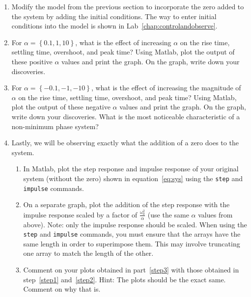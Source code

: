 \begin{enumerate}
    \item Modify the model from the previous section to incorporate the zero
          added to the system by adding the initial conditions. The way to enter
          initial conditions into the model is shown in
          Lab~\ref{chap:controlandobserve}.

    \item For \(\alpha = \left\{0.1, 1, 10\right\} \), what is the effect of increasing %
          \(\alpha \) on the rise time, settling time, overshoot, and peak
          time?  Using \textsf{Matlab}, plot the output of these positive
          \(\alpha \) values and print the graph.  On the graph, write down your
          discoveries.\label{step1}

    \item For \(\alpha = \left\{-0.1, -1, -10\right\} \), what is the effect of increasing the %
          magnitude of \(\alpha \) on the rise time, settling time, overshoot,
          and peak time? Using \textsf{Matlab}, plot the output of these negative \(\alpha \) values and print the graph.  On the graph, write down
          your discoveries.  What is the most noticeable characteristic of a
          non-minimum phase system?\label{step2}
    \item\label{step:superposition} Lastly, we will be observing exactly what the addition of a zero does
          to the system.
          \begin{enumerate}
              \item In Matlab, plot the step response and impulse response of your
                    original system (without the zero) shown in equation~\ref{eq:sys} using the \verb|step| and
                    \verb|impulse| commands.
              \item\label{step3} On a separate graph, plot the addition of the step response with
                    the impulse response scaled by a factor of \(\frac{\omega_0^2}{\alpha} \) (use the same \(\alpha \) values from above). Note: only the impulse response should be scaled. When using the
                    \verb|step| and \verb|impulse| commands, you must ensure that the arrays have the same length in
                    order to superimpose them. This may involve truncating one array to match the length of the other.
              \item Comment on your plots obtained in part~\ref{step3} with those obtained in step~\ref{step1} and~\ref{step2}. Hint: The plots should be the exact same. Comment on why that is.
          \end{enumerate}
\end{enumerate}


